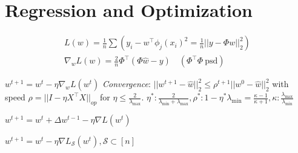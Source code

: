 \section{Regression and Optimization}

\begin{definition}
  \begin{gather*}
    L(w) = \frac{1}{n}\sum(y_i - w^\top \phi_j(x_i)^2 = \frac{1}{n}||y - \Phi w||_2^2) \\
    \nabla_w L(w) = \frac{2}{n}\Phi^\top (\Phi \hat{w} - y) \quad (\Phi^\top \Phi \ \text{psd})
  \end{gather*}
\end{definition}

\begin{definition}
  \(w^{t+1} = w^t - \eta\nabla_wL(w^t)\)
  \textit{Convergence}: \(||w^{t+1} - \hat{w}||_2^2 \leq \rho^{t+1} ||w^0 - \hat{w}||_2^2\) with speed \(\rho = ||I - \eta X^\top X||_{op}\) for \(\eta \leq \frac{2}{\lambda_{\max}}\). \(\eta^* : \frac{2}{\lambda_{\min} + \lambda_{\max}}, \rho^* : 1 - \eta^* \lambda_{\min} =\frac{\kappa - 1}{\kappa + 1}, \kappa : \frac{\lambda_{\max}}{\lambda_{\min}}\)
\end{definition}

\begin{definition}[Momentum]
  \(w^{t+1} = w^t + \Delta w^{t-1} - \eta \nabla L(w^t)\)
\end{definition}

\begin{definition}[SGD]
  \(w^{t+1} = w^t - \eta \nabla L_{\mathcal{S}}(w^t), \mathcal{S} \subset [n]\)
\end{definition}
